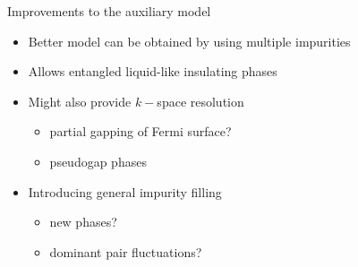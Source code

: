 \documentclass[10pt,aspectratio=169]{beamer}
\begin{document}
\begin{frame}{Improvements to the auxiliary model}
\begin{itemize}
	\item Better model can be obtained by using multiple impurities\\[20pt]
	\item Allows entangled liquid-like insulating phases\\[20pt]
	\item Might also provide \(k-\)space resolution 
	\begin{itemize}
		\item partial gapping of Fermi surface?
		\item pseudogap phases\\[20pt]
	\end{itemize}
	\item Introducing general impurity filling
	\begin{itemize}
		\item new phases?
		\item dominant pair fluctuations?
	\end{itemize}
\end{itemize}
\end{frame}
\end{document}
